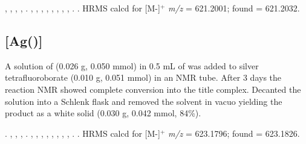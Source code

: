 ,
,
,
,
.
,
,
,
,
,
,
, %
,
.
.
HRMS calcd for  [M-]$^+$ \emph{m/z} = 621.2001; found = 621.2032.



\subsection*{\texorpdfstring{[Ag(\tButhixantphos)]} A}


A solution of \tButhixantphos{} (0.026 g, 0.050 mmol) in 0.5 mL of  was added to silver tetrafluoroborate (0.010 g, 0.051 mmol) in an NMR tube.  After 3 days the reaction NMR showed complete conversion into the title complex.  Decanted the solution into a Schlenk flask and removed the solvent in vacuo yielding the product as a white solid (0.030 g, 0.042 mmol, 84\%).

\begin{sloppypar}
.
,
,
,
.
,
,
,
,
,
, %
,
,
.
.
HRMS calcd for  [M-]$^+$ \emph{m/z} = 623.1796; found = 623.1826.
\end{sloppypar}

